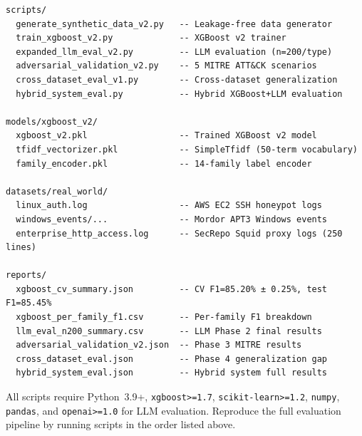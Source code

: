 \documentclass[11pt,a4paper]{article}
\begin{document}
\begin{verbatim}
scripts/
  generate_synthetic_data_v2.py   -- Leakage-free data generator
  train_xgboost_v2.py             -- XGBoost v2 trainer
  expanded_llm_eval_v2.py         -- LLM evaluation (n=200/type)
  adversarial_validation_v2.py    -- 5 MITRE ATT&CK scenarios
  cross_dataset_eval_v1.py        -- Cross-dataset generalization
  hybrid_system_eval.py           -- Hybrid XGBoost+LLM evaluation

models/xgboost_v2/
  xgboost_v2.pkl                  -- Trained XGBoost v2 model
  tfidf_vectorizer.pkl            -- SimpleTfidf (50-term vocabulary)
  family_encoder.pkl              -- 14-family label encoder

datasets/real_world/
  linux_auth.log                  -- AWS EC2 SSH honeypot logs
  windows_events/...              -- Mordor APT3 Windows events
  enterprise_http_access.log      -- SecRepo Squid proxy logs (250 lines)

reports/
  xgboost_cv_summary.json         -- CV F1=85.20% ± 0.25%, test F1=85.45%
  xgboost_per_family_f1.csv       -- Per-family F1 breakdown
  llm_eval_n200_summary.csv       -- LLM Phase 2 final results
  adversarial_validation_v2.json  -- Phase 3 MITRE results
  cross_dataset_eval.json         -- Phase 4 generalization gap
  hybrid_system_eval.json         -- Hybrid system full results
\end{verbatim}

\noindent All scripts require Python~3.9+, \texttt{xgboost>=1.7}, \texttt{scikit-learn>=1.2},
\texttt{numpy}, \texttt{pandas}, and \texttt{openai>=1.0} for LLM evaluation.
Reproduce the full evaluation pipeline by running scripts in the order listed above.
\end{document}

